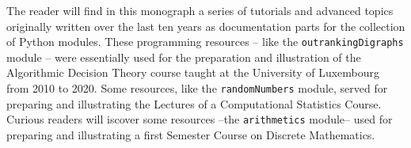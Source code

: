 %
%

\preface






The reader will find in this monograph a series of tutorials and advanced topics originally written over the last ten years as documentation parts for the \Digraph collection of Python modules. These programming resources -- like the \texttt{outrankingDigraphs} module -- were essentially used for the preparation and illustration of the Algorithmic Decision Theory course taught at the University of Luxembourg from 2010 to 2020. Some resources, like the \texttt{randomNumbers} module, served for preparing and illustrating the Lectures of a Computational Statistics Course. Curious readers will iscover some resources --the \texttt{arithmetics} module-- used for preparing and illustrating a first Semester Course on Discrete Mathematics.


